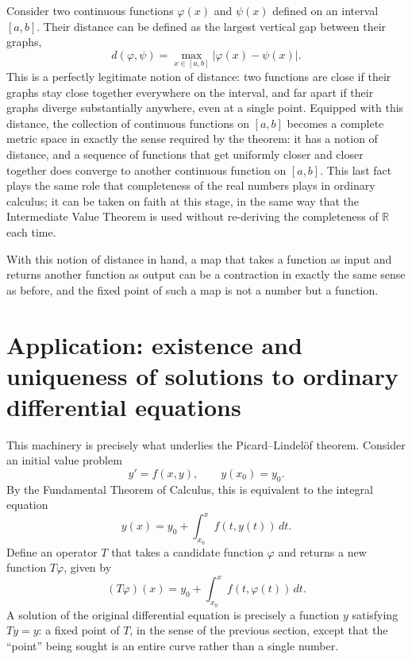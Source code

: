 \documentclass{essay}
\begin{document}
Consider two continuous functions \(\varphi(x)\) and \(\psi(x)\) defined
on an interval \([a, b]\). Their distance can be defined as the largest
vertical gap between their graphs,
\[ d(\varphi, \psi) = \max_{x \in [a,b]} |\varphi(x) - \psi(x)|. \]
This is a perfectly legitimate notion of distance: two functions are
close if their graphs stay close together everywhere on the
interval, and far apart if their graphs diverge substantially
anywhere, even at a single point. Equipped with this distance, the
collection of continuous functions on \([a,b]\) becomes a complete
metric space in exactly the sense required by the theorem: it has a
notion of distance, and a sequence of functions that get uniformly
closer and closer together does converge to another continuous
function on \([a,b]\). This last fact plays the same role that
completeness of the real numbers plays in ordinary calculus; it can
be taken on faith at this stage, in the same way that the
Intermediate Value Theorem is used without re-deriving the
completeness of \(\mathbb{R}\) each time.

With this notion of distance in hand, a map that takes a function as
input and returns another function as output can be a contraction in
exactly the same sense as before, and the fixed point of such a map
is not a number but a function.

\section{Application: existence and uniqueness of solutions to ordinary differential equations}

This machinery is precisely what underlies the Picard--Lindel\"of
theorem. Consider an initial value problem
\[ y' = f(x, y), \qquad y(x_{0}) = y_{0}. \]
By the Fundamental Theorem of Calculus, this is equivalent to the
integral equation
\[ y(x) = y_{0} + \int_{x_{0}}^{x} f(t, y(t))\, dt. \]
Define an operator \(T\) that takes a candidate function \(\varphi\) and
returns a new function \(T\varphi\), given by
\[ (T\varphi)(x) = y_{0} + \int_{x_{0}}^{x} f(t, \varphi(t))\, dt. \]
A solution of the original differential equation is precisely a
function \(y\) satisfying \(Ty = y\): a fixed point of \(T\), in the sense
of the previous section, except that the ``point'' being sought is
an entire curve rather than a single number.
\end{document}

